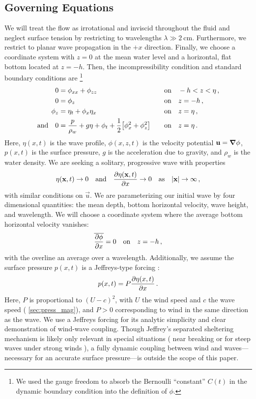 \documentclass{jfm}
\begin{document}
\subsection{Governing Equations}
We will treat the flow as irrotational and inviscid throughout the
fluid and neglect surface tension by restricting to wavelengths $\lambda
\gg \SI{2}{\centi\meter}$.
Furthermore, we restrict to planar wave propagation in the $+x$
direction.
Finally, we choose a coordinate system with $z=0$ at the mean water level and
a horizontal, flat bottom located at $z=-h$.
Then, the incompressibility condition and standard boundary conditions
are%
\footnote{
  We used the gauge freedom to absorb the Bernoulli ``constant'' $C(t)$
  in the dynamic boundary condition into the definition of $\phi$.
}
\begin{alignat}{2}
  0 &= \phi_{xx} + \phi_{zz} &&\qq{on}
  -h < z < \eta \,, \label{eq:laplace}\\
  0 &= \phi_{z} &&\qq{on} z=-h \,, \label{eq:bottom_bc}\\
  \phi_{z} &= \eta_{t} + \phi_{x} \eta_{x} &&\qq{on} z = \eta \,,
  \label{eq:kinematic_bc}\\
  \qq*{and} 0 &= \frac{p}{\rho_w} + g\eta + \phi_{t} +
  \frac{1}{2} \bqty{\phi_{x}^2 + \phi_{z}^2} &&\qq{on} z=
  \eta \,. \label{eq:dynamic_bc}
\end{alignat}
Here, $\eta(x,t)$ is the wave profile, $\phi(x,z,t)$ is the velocity
potential $\mathbf{\bm{u}} = \grad{\phi}$, $p(x,t)$ is the surface pressure,
$g$ is the acceleration due to gravity, and $\rho_w$ is the water
density.
We are seeking a solitary, progressive wave with properties
\begin{gather}
  \eta(\vec{x},t) \to 0 \qq{and} \pdv{\eta(\vec{x},t)}{x} \to 0 \qq{as}
  \abs{\vec{x}} \to \infty \,,
\end{gather}
with similar conditions on $\vec{u}$.
We are parameterizing our initial wave by four dimensional quantities:
the mean depth, bottom horizontal velocity, wave height, and wavelength.
We will choose a coordinate system where the average bottom horizontal
velocity vanishes:
\begin{equation}
  \overline{ \pdv{\phi}{x} } = 0 \qq{on} z=-h \,,
  \label{eq:bot_bc_horz}
\end{equation}
with the overline an average over a wavelength.
Additionally, we assume the surface pressure $p(x,t)$ is a Jeffreys-type
forcing \citep{jeffreys1925formation}:
\begin{equation}
  p(x,t) = P \pdv{\eta(x,t)}{x} \,.
\end{equation}
Here, $P$ is proportional to $(U-c)^2$, with $U$ the wind speed and $c$
the wave speed (\cf{} \cref{sec:press_mag}), and $P>0$ corresponding to
wind in the same direction as the wave.
We use a Jeffreys forcing for its analytic simplicity and clear
demonstration of wind-wave coupling.
Though Jeffrey's separated sheltering mechanism is likely only relevant
in special situations (\eg{} near breaking
\citealp{banner1976separation} or for steep waves under strong winds
\citealp{tian2013evolution,touboul2006interaction}),
a fully dynamic coupling between wind and waves---necessary for an
accurate surface pressure---is outside the scope of this paper.
\end{document}
